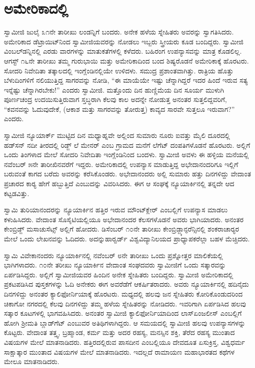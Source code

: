 
\chapter{ಅಮೇರಿಕಾದಲ್ಲಿ}

\vskip 10pt

 ಸ್ವಾಮೀಜಿ ಜುಲೈ ೩೧ನೇ ತಾರೀಖು ಲಂಡನ್ನಿಗೆ ಬಂದರು. ಅನೇಕ ಹಳೆಯ ಸ್ನೇಹಿತರು ಅವರನ್ನು ಸ್ವಾಗತಿಸಿದರು. ಅಮೇರಿಕಾದ ಡೆಟ್ರಾಯಿಟ್‍ನಿಂದ ಸ್ವಾಮೀಜಿಯವರನ್ನು ನೋಡಲು ಇಬ್ಬರು ಸ್ತ್ರೀಯರು ಕೂಡ ಬಂದಿದ್ದರು. ಸ್ವಾಮೀಜಿ ವಿಂಬಲ್‍ಡನ್ನಿನಲ್ಲಿ ಎರಡು ವಾರಗಳನ್ನು ಮಾತುಕತೆಗಳಲ್ಲಿ ಕಳೆದರು. ಬಹಿರಂಗ ಉಪನ್ಯಾಸವನ್ನು ಮಾತ್ರ ಕೊಡಲಿಲ್ಲ. ಆಗಸ್ಟ್ ೧೬ನೇ ತಾರೀಖು ತಮ್ಮ ಗುರುಭಾಯಿ ಮತ್ತು ಅಮೇರಿಕಾದಿಂದ ಬಂದ ಶಿಷ್ಯರೊಡನೆ ಅಮೇರಿಕಾಕ್ಕೆ ಹೊರಟರು. ಸೋದರಿ ನಿವೇದಿತಾ ತತ್ಕಾಲದಲ್ಲಿ ಇಂಗ್ಲೆಂಡಿನಲ್ಲಿಯೇ ಉಳಿದಳು. ಸಮುದ್ರ ಪ್ರಶಾಂತವಾಗಿತ್ತು. ರಾತ್ರಿಯ ಹೊತ್ತು ಬೆಳುದಿಂಗಳಿಗೆ ನಲಿಯುತ್ತಿದ್ದ ಸಾಗರವನ್ನು ನೋಡಿ, “ಈ ಮಾಯೆಯೇ ಇಷ್ಟು ಚೆನ್ನಾಗಿದ್ದರೆ ಇದರ ಹಿಂದೆ ಇರುವ ಸತ್ಯ ಇನ್ನೆಷ್ಟು ಚೆನ್ನಾಗಿರಬೇಕು!” ಎಂದರು ಸ್ವಾಮೀಜಿ. ಮತ್ತೊಂದು ದಿನ ಹುಣ್ಣಿಮೆಯ ದಿನ ಸೂರ್ಯ ಮುಳುಗಿ ಪೂರ್ಣಚಂದ್ರ ಉದಯಿಸುತ್ತಿರುವಾಗ ಸ್ತಬ್ಧರಾಗಿ ಕೆಲವು ಕಾಲ ಅದನ್ನೇ ನೋಡುತ್ತ ಅನಂತರ ಸುತ್ತಲಿದ್ದವರಿಗೆ, “ಕವನವನ್ನು ಓದುವುದೇಕೆ, (ಆಕಾಶ ಮತ್ತು ಸಾಗರವನ್ನು ತೋರುತ್ತ) ಕಾವ್ಯದ ಸಾರವೇ ಸುತ್ತಲೂ ಇರುವಾಗ?” ಎಂದರು. 

 ಸ್ವಾಮೀಜಿ ನ್ಯೂಯಾರ್ಕ್ ಮುಟ್ಟಿದ ದಿನ ಮಧ್ಯಾಹ್ನವೇ ಅಲ್ಲಿಂದ ಸುಮಾರು ನೂರು ಐವತ್ತು ಮೈಲಿ ದೂರದಲ್ಲಿ ಹಡ್‍ಸನ್ ನದೀ ತೀರದಲ್ಲಿ ರಿಡ್ಜ್ ಲೆ ಮೇನರ್ ಎಂಬ ಗ್ರಾಮದ ಮನೆಗೆ ಲೆಗೆಟ್ ದಂಪತಿಗಳೊಡನೆ ಹೊರಟರು. ಅಲ್ಲಿಗೆ ಒಂದು ತಿಂಗಳಾದ ಮೇಲೆ ಸೋದರಿ ನಿವೇದಿತಾ ಇಂಗ್ಲೆಂಡಿನಿಂದ ಬಂದಳು. ಸ್ವಾಮೀಜಿ ಅವಳು ಈ ಹಳ್ಳಿಯ ಮನೆಯಲ್ಲಿ ನವೆಂಬರ್ ೫ನೇ ತಾರೀಖಿನವರೆಗೆ ಇದ್ದರು. ಅಮೇರಿಕಾದಲ್ಲಿ ಉಪನ್ಯಾಸ ಮಾಡುತ್ತಿದ್ದ ಅಭೇದಾನಂದರಿಗೂ ಇಲ್ಲಿಗೆ ಬರುವಂತೆ ಕಾಗದ ಬರೆದು ಅವರನ್ನು ಕರೆಸಿಕೊಂಡರು. ಅಭೇದಾನಂದರು ಅಲ್ಲಿ ಸುಮಾರು ಹತ್ತು ದಿನಗಳಿದ್ದು ವೇದಾಂತ ಪ್ರಚಾರದ ಕಾರ‍್ಯ ಹೇಗೆ ಹಬ್ಬುತ್ತಿದೆ ಎಂಬುದನ್ನು ವಿವರಿಸಿದರು. ಈಗ ಆ ಸಂಘಕ್ಕೆ ನ್ಯೂಯಾರ್ಕಿನಲ್ಲಿ ತನ್ನದೇ ಆದ ಕಟ್ಟಡವಿತ್ತು. 

 ಸ್ವಾಮಿ ತುರಿಯಾನಂದರನ್ನು ನ್ಯೂಯಾರ್ಕಿನ ಹತ್ತಿರ ಇರುವ ಮೌಂಟ್‍ಕ್ಲೇರ್ ಎಂಬಲ್ಲಿಗೆ ಉಪನ್ಯಾಸ ಮಾಡಲು ಕಳುಹಿಸಿದರು. ವೇದಾಂತ ಸೊಸೈಟಿಯಲ್ಲಿಯೂ ಅಭೇದಾನಂದರ ಕೆಲಸಗಳೊಡನೆ ಅವರು ಭಾಗಿಯಾದರು. ಅನಂತರ ಕೇಂಬ್ರಿಡ್ಜ್ ಮಸಾಚುಸೆಟ್ಸ್ ಅಲ್ಲಿಗೆ ಹೋದರು. ಡಿಸೆಂಬರ್ ೧೦ನೇ ತಾರೀಖು ಕೇಂಬ್ರಿಡ್ಜ್\break ಕಾನ್ಫರೆನ್ಸಿನಲ್ಲಿ ಶಂಕರಾಚಾರ‍್ಯರ ಮೇಲೆ ಒಂದು ಲೇಖನವನ್ನು ಓದಿದರು. ಅದನ್ನು\break ಹಾರ್‍ವರ್ಡ್ ವಿಶ್ವವಿದ್ಯಾನಿಲಯದ ಪ್ರಾಧ್ಯಾಪಕರೆಲ್ಲಾ ಬಹಳ ಮೆಚ್ಚಿದರು. 

 ಸ್ವಾಮಿ ವಿವೇಕಾನಂದರು ನ್ಯೂಯಾರ್ಕಿನಲ್ಲಿ ನವೆಂಬರ್ ೮ನೇ ತಾರೀಖು ಒಂದು ಪ್ರಶ್ನೋತ್ತರ ಮಾಲಿಕೆಯಲ್ಲಿ ಭಾಗಿಗಳಾದರು. ೧೦ನೇ ತರೀಖು ನ್ಯೂಯಾರ್ಕಿನ ವೇದಾಂತ ಸಂಘದವರು ಸ್ವಾಮೀಜಿಗೆ ಒಂದು ಸತ್ಕಾರವನ್ನು ಏರ್ಪಡಿಸಿದ್ದರು. ಅಲ್ಲಿಗೆ ಸ್ವಾಮೀಜಿಯವರ ಹಿಂದಿನ ಅನೇಕ ಸ್ನೇಹಿತರು ಬಂದಿದ್ದರು. ಸ್ವಾಮೀಜಿ ಅಮೇರಿಕಾದಲ್ಲಿ ಪ್ರಕಟಪಡಿಸಿದ ಪುಸ್ತಕಗಳನ್ನು ಓದಿ ಅನೇಕರು ಈಗ ಅವರೆಡೆಗೆ ಆಕರ್ಷಿತರಾದರು. ಅವರು ನ್ಯೂಯಾರ್ಕಿನಲ್ಲಿ ಹದಿನೈದು ದಿನಗಳಿದ್ದು ಅನಂತರ ಕ್ಯಾಲಿಫೋರ್ನಿಯಾಕ್ಕೆ ಹೊರಟರು. ಮಧ್ಯದಲ್ಲಿ ಹಲವು ಜನ ಸ್ನೇಹಿತರು ಕೋರಿಕೊಂಡುದರಿಂದ ಚಿಕಾಗೋ ನಗರದಲ್ಲಿ ಕೆಲವು ದಿನಗಳಿದ್ದು ತಮ್ಮ ಹಳೆಯ ಸ್ನೇಹಿತರನ್ನು ನೋಡಿದರು. ಇವರಿಗಾಗಿ ಏರ್ಪಡಿಸಿದ ಹಲವು ಸತ್ಕಾರ ಕೂಟಗಳಲ್ಲಿ ಭಾಗವಹಿಸಿದರು. ಅನಂತರ ಸ್ವಾಮೀಜಿ ಕ್ಯಾಲಿಫೋರ್ನಿಯಾದಿಂದ ಲಾಸ್‍ಏಂಜಲೀಸ್ ಎಂಬಲ್ಲಿಗೆ ಹೋಗಿ ಶ‍್ರೀಮತಿ ಬ್ಲಾಡ್‍ಗೆಟ್ ಎಂಬುವರ ಅತಿಥಿಗಳಾಗಿದ್ದರು. ಆ ಸಮಯದಲ್ಲಿ ಸ್ವಾಮೀಜಿ ಹಲವು ಉಪನ್ಯಾಸಗಳನ್ನು ಕೊಟ್ಟರು. ವೇದಾಂತ ತತ್ತ್ವ, ಬ್ರಹ್ಮಾಂಡ, ಕರ್ಮ ಮತ್ತು ಅದರ ರಹಸ್ಯ, ಮನಸ್ಸಿನ ಶಕ್ತಿ, ತೆರೆದ ರಹಸ್ಯ ಮುಂತಾದ ವಿಷಯಗಳ ಮೇಲೆ ಮಾತನಾಡಿದರು. ಹತ್ತಿರದಲ್ಲಿರುವ ಪಾಸದೀನ ಎಂಬಲ್ಲಿಯೂ ದೇವದೂತ ಏಸುಕ್ರಿಸ್ತ, ವಿಶ್ವಧರ್ಮ ಸಾಕ್ಷಾತ್ಕಾರ ಮುಂತಾದ ವಿಷಯಗಳ ಮೇಲೆ ಮಾತನಾಡಿದರು. ಇದಲ್ಲದೆ ರಾಮಾಯಣ ಮಹಾಭಾರತದ ಕಥೆಗಳ ಮೇಲೂ ಮಾತನಾಡಿದರು. 

